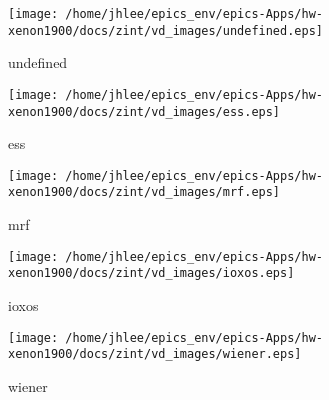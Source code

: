 \noindent
\vspace{1.4cm}
\begin{minipage}{.2\textwidth}
\begin{center}
\texttt{[image: /home/jhlee/epics\_env/epics-Apps/hw-xenon1900/docs/zint/vd\_images/undefined.eps]}
\end{center}
\end{minipage}
\begin{minipage}{.7\textwidth}
undefined
\end{minipage}


\noindent
\vspace{1.4cm}
\begin{minipage}{.2\textwidth}
\begin{center}
\texttt{[image: /home/jhlee/epics\_env/epics-Apps/hw-xenon1900/docs/zint/vd\_images/ess.eps]}
\end{center}
\end{minipage}
\begin{minipage}{.7\textwidth}
ess
\end{minipage}


\noindent
\vspace{1.4cm}
\begin{minipage}{.2\textwidth}
\begin{center}
\texttt{[image: /home/jhlee/epics\_env/epics-Apps/hw-xenon1900/docs/zint/vd\_images/mrf.eps]}
\end{center}
\end{minipage}
\begin{minipage}{.7\textwidth}
mrf
\end{minipage}


\noindent
\vspace{1.4cm}
\begin{minipage}{.2\textwidth}
\begin{center}
\texttt{[image: /home/jhlee/epics\_env/epics-Apps/hw-xenon1900/docs/zint/vd\_images/ioxos.eps]}
\end{center}
\end{minipage}
\begin{minipage}{.7\textwidth}
ioxos
\end{minipage}


\noindent
\vspace{1.4cm}
\begin{minipage}{.2\textwidth}
\begin{center}
\texttt{[image: /home/jhlee/epics\_env/epics-Apps/hw-xenon1900/docs/zint/vd\_images/wiener.eps]}
\end{center}
\end{minipage}
\begin{minipage}{.7\textwidth}
wiener
\end{minipage}


